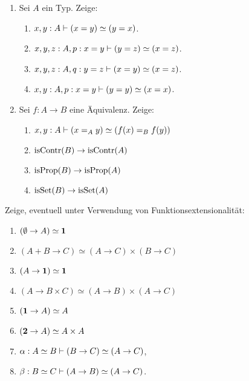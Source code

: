 \documentclass{uebung}
\begin{document}
\begin{exercise}
  \begin{enumerate}
    \item Sei $A$ ein Typ.
      Zeige:
        \begin{enumerate}
          \item $x,y:A \vdash (x=y) \simeq (y=x)$.
          \item $x,y,z:A,p:x=y \vdash (y=z) \simeq (x=z)$.
          \item $x,y,z:A,q:y=z \vdash (x=y) \simeq (x=z)$.
          \item $x,y:A,p:x=y \vdash (y=y) \simeq (x=x)$.
        \end{enumerate}

    \item Sei $f:A\to B$ eine Äquivalenz.
      Zeige:
        \begin{enumerate}
          \item $x,y:A\vdash (x =_A y)\simeq (f(x) =_B f(y))$
          \item $\mathrm{isContr}(B)\to\mathrm{isContr}(A)$
          \item $\mathrm{isProp}(B)\to\mathrm{isProp}(A)$
          \item $\mathrm{isSet}(B)\to\mathrm{isSet}(A)$
        \end{enumerate}
  \end{enumerate}
\end{exercise}

\begin{exercise}[Äquivalenzen II]
  Zeige, eventuell unter Verwendung von Funktionsextensionalität:
  \begin{multicols}{2}
  \begin{enumerate}
    \item $(\emptyset \to A) \simeq \mathbf{1}$
    \item $(A+B\to C) \simeq (A \to C) \times (B \to C)$
    \item $(A \to \mathbf{1}) \simeq \mathbf{1}$
    \item $(A \to B\times C) \simeq (A \to B) \times (A \to C)$
    \item $(\mathbf{1} \to A)\simeq A$
    \item $(\mathbf{2} \to A)\simeq A\times A$
    \item $\alpha:A\simeq B \vdash (B\to C) \simeq (A\to C)$,
    \item $\beta:B\simeq C \vdash (A\to B)\simeq (A\to C)$.
  \end{enumerate}
  \end{multicols}
\end{exercise}
\end{document}

